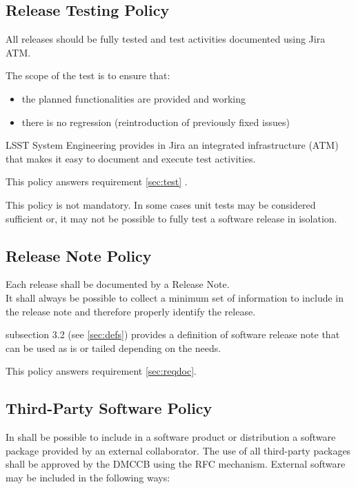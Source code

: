 \subsection{Release Testing Policy} \label{sec:testpolicy}

All releases should be fully tested and test activities documented using Jira ATM.

The scope of the test is to ensure that:

\begin{itemize}
\item the planned functionalities are provided and working
\item there is no regression (reintroduction of previously fixed issues)
\end{itemize}

LSST System Engineering provides in Jira an integrated infrastructure (ATM) that makes it easy to document and execute test activities.

This policy answers requirement \ref{sec:test} .

This policy is not mandatory.
In some cases unit tests may be considered sufficient or, it may not be possible to fully test a software release in isolation.


\subsection{Release Note Policy} \label{sec:notepolicy}

Each release shall be documented by a Release Note.\\
It shall always be possible to collect a minimum set of information to include in the release note and therefore properly identify the release.

 subsection 3.2 (see \ref{sec:defs}) provides a definition of software release note that can be used as is or tailed depending on the needs.

This policy answers requirement \ref{sec:reqdoc}.


\subsection{Third-Party Software Policy} \label{sec:thirdpolicy}

In shall be possible to include in a software product or distribution a software package provided by an external collaborator.
The use of all third-party packages shall be approved by the DMCCB using the RFC mechanism.
External software may be included in the following ways:

